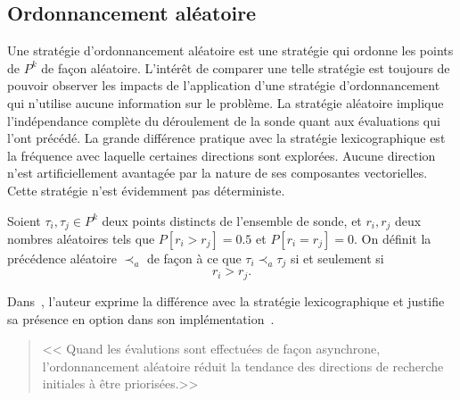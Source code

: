 \subsection{Ordonnancement aléatoire}\label{sec:ale}
Une stratégie d'ordonnancement aléatoire est une stratégie qui ordonne les points de $P^k$ de façon aléatoire. L'intérêt de comparer une telle stratégie est toujours de pouvoir observer les impacts de l'application d'une stratégie d'ordonnancement qui n'utilise aucune information sur le problème. La stratégie aléatoire implique l'indépendance complète du déroulement de la sonde quant aux évaluations qui l'ont précédé. La grande différence pratique avec la stratégie lexicographique est la fréquence avec laquelle certaines directions sont explorées. Aucune direction n'est artificiellement avantagée par la nature de ses composantes vectorielles. Cette stratégie n'est évidemment pas déterministe.
\begin{definition}\label{def:aleatoire}
	Soient $\tau_i,\tau_j \in P^k$ deux points distincts de l'ensemble de sonde, et $r_i, r_j$ deux nombres aléatoires tels que $P[r_i>r_j] = 0.5$ et $P[r_i = r_j] = 0$. On définit la précédence aléatoire  $\prec_a$ de façon à ce que $\tau_i \prec_a \tau_j$ si et seulement si $$r_i > r_j.$$		
\end{definition}
Dans~\cite{Plan09}, l'auteur exprime la différence avec la stratégie lexicographique et justifie sa présence en option dans son implémentation~\cite{GrKo06}.
\begin{quote}
	<<
	Quand les évalutions sont effectuées de façon asynchrone, l'ordonnancement aléatoire réduit la tendance des directions de recherche initiales à être priorisées.>>
\end{quote}
